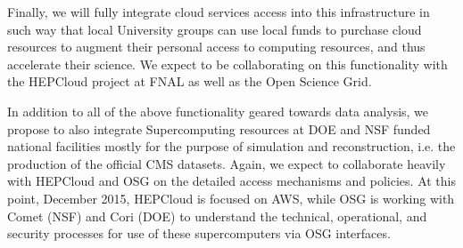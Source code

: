 \documentclass[11pt,a4paper]{article}
\begin{document}
%

Finally, we will fully integrate cloud services access into this
infrastructure in such way that local University groups can use local
funds to purchase cloud resources to augment their personal access to
computing resources, and thus accelerate their science. We expect to
be collaborating on this functionality with the HEPCloud project at
FNAL as well as the Open Science Grid.

In addition to all of the above functionality geared towards data
analysis, we propose to also integrate Supercomputing resources at DOE
and NSF funded national facilities mostly for the purpose of
simulation and reconstruction, i.e. the production of the official CMS
datasets.  Again, we expect to collaborate heavily with HEPCloud and
OSG on the detailed access mechanisms and policies.  At this point,
December 2015, HEPCloud is focused on AWS, while OSG is working with
Comet (NSF) and Cori (DOE) to understand the technical, operational,
and security processes for use of these supercomputers via OSG
interfaces.
\end{document}
